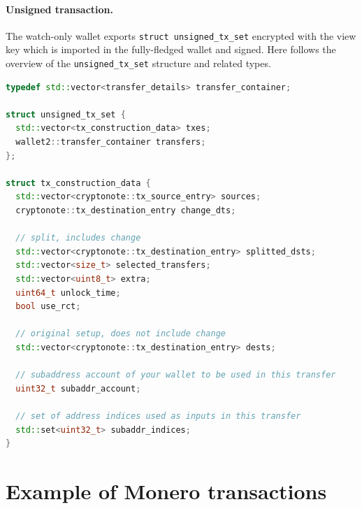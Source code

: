 \documentclass[]{article}
\begin{document}
\paragraph{Unsigned transaction.}
The watch-only wallet exports \verb|struct unsigned_tx_set| encrypted with the view key which is imported in the fully-fledged wallet and signed. Here follows the overview of the \verb|unsigned_tx_set| structure and related types.

\begin{lstlisting}[language=c++]
typedef std::vector<transfer_details> transfer_container;

struct unsigned_tx_set {
  std::vector<tx_construction_data> txes;
  wallet2::transfer_container transfers;
};

struct tx_construction_data {
  std::vector<cryptonote::tx_source_entry> sources;
  cryptonote::tx_destination_entry change_dts;
  
  // split, includes change
  std::vector<cryptonote::tx_destination_entry> splitted_dsts; 
  std::vector<size_t> selected_transfers;
  std::vector<uint8_t> extra;
  uint64_t unlock_time;
  bool use_rct;
  
  // original setup, does not include change
  std::vector<cryptonote::tx_destination_entry> dests; 
  
  // subaddress account of your wallet to be used in this transfer
  uint32_t subaddr_account;  
  
  // set of address indices used as inputs in this transfer
  std::set<uint32_t> subaddr_indices;  
}
\end{lstlisting}



%



\appendix
\section{Example of Monero transactions}
\end{document}

